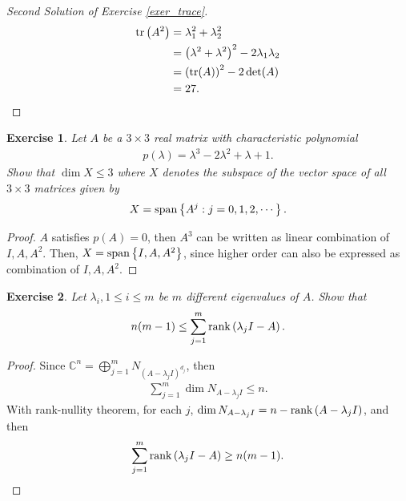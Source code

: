 \documentclass[11pt]{book}
\newtheorem{exercise}{Exercise}[section]
\theoremstyle{definition}
\numberwithin{equation}{chapter}
\begin{document}
\medskip

\begin{proof}[Second Solution of Exercise \ref{exer_trace}]
\begin{align*}
    {\rm tr}\left(A^2 \right) & = \lambda_1^2 + \lambda_2^2 \\
    & = \left(\lambda^2 + \lambda^2\right)^2 - 2 \lambda_1 \lambda_2 \\
    & = \left( {\rm tr}(A)\right)^2 - 2 \det (A) \\
    & = 27.
\end{align*}
\end{proof}

\medskip

\begin{exercise}
Let $A$ be a $3 \times 3$ real matrix with characteristic polynomial
\begin{align*}
    p(\lambda) = \lambda^3 - 2 \lambda^2 + \lambda + 1.
\end{align*}
Show that $\dim  X \leq 3$ where $X$ denotes the subspace of the vector space of all $3 \times 3$ matrices given by 
\begin{align*}
    X = {\rm span} \left\{A^j: j = 0,1,2,\cdots\right\}.
\end{align*}
\end{exercise}
\begin{proof}
$A$ satisfies $p(A) = 0$, then $A^3$ can be written as linear combination of $I, A, A^2$. Then, $X = {\rm span} \left\{I, A, A^2\right\}$, since higher order can also be expressed as combination of $I, A, A^2$.
\end{proof}

\medskip

\begin{exercise}
Let $\lambda_i, 1 \leq i \leq m$ be $m$ different eigenvalues of $A$. Show that
\begin{align*}
    n(m - 1) \leq \sum^m_{j=1} \rank \left(\lambda_j I - A\right).
\end{align*}
\end{exercise}
\begin{proof}
Since $\mathbb{C}^n = \bigoplus^m_{j=1} N_{\left(A - \lambda_j I\right)^{d_j}}$, then 
\begin{align*}
    \sum^m_{j=1} \dim  N_{A - \lambda_j I} \leq n.
\end{align*}
With rank-nullity theorem, for each $j$, $\dim  N_{A - \lambda_j I} = n - \rank \left(A - \lambda_j I\right)$, and then
\begin{align*}
    \sum^m_{j=1} \rank \left(\lambda_j I - A\right) \geq n(m - 1).
\end{align*}
\end{proof}
\end{document}
